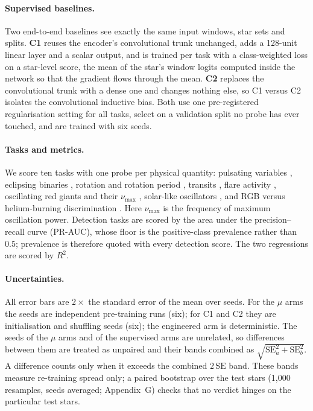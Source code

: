 \documentclass{article}
\begin{document}
\paragraph{Supervised baselines.} Two end-to-end baselines see exactly the same input windows, star
sets and splits. \textbf{C1} reuses the encoder's convolutional trunk unchanged, adds a 128-unit linear layer
and a scalar output, and is trained per task with a class-weighted loss on a star-level score, the mean of the star's window
logits computed inside the network so that the gradient flows through the mean. \textbf{C2} replaces the convolutional trunk with a
dense one and changes nothing else, so C1 versus C2 isolates the convolutional inductive bias. Both
use one pre-registered regularisation setting for all tasks, select on a validation split no probe
has ever touched, and are trained with six seeds.

\paragraph{Tasks and metrics.} We score ten tasks with one probe per physical quantity: pulsating
variables \citep{gao2025}, eclipsing binaries \citep{prsa2022}, rotation and rotation period
\citep{boyle2026}, transits \citep{guerrero2021}, flare activity \citep{seli2025,vida2021},
oscillating red giants and their $\nu_{\max}$ \citep{hon2021}, solar-like oscillators
\citep{hatt2023}, and RGB versus helium-burning discrimination \citep{sreenivas2026}. Here
$\nu_{\max}$ is the frequency of maximum oscillation power. Detection tasks are scored by the area
under the precision--recall curve (PR-AUC), whose floor is the positive-class prevalence rather than
$0.5$; prevalence is therefore quoted with every detection score. The two regressions are scored by
$R^{2}$.

\paragraph{Uncertainties.} All error bars are $2\times$ the standard error of the mean over seeds.
For the $\mu$ arms the seeds are independent pre-training runs (six); for C1 and C2 they are
initialisation and shuffling seeds (six); the engineered arm is
deterministic. The seeds of the $\mu$ arms and of the supervised arms are unrelated, so differences
between them are treated as unpaired and their bands combined as $\sqrt{\mathrm{SE}_a^{2}+\mathrm{SE}_b^{2}}$.
A difference counts only when it exceeds the combined $2\,\mathrm{SE}$ band. These bands
measure re-training spread only; a paired bootstrap over the test stars (1{,}000 resamples, seeds
averaged; Appendix~G) checks that no verdict hinges on the particular test stars.
\end{document}
